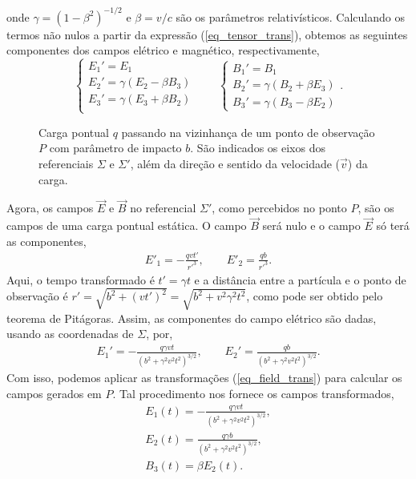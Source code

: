 onde $\gamma = (1-\beta ^2)^{-1/2}$ e $\beta = v/c$ são os parâmetros
relativísticos. Calculando os termos não nulos a partir da expressão
(\ref{eq_tensor_trans}), obtemos as seguintes componentes dos campos elétrico e
magnético, respectivamente,
\begin{equation}
	\label{eq_field_trans}
    \begin{cases}
	E_1' = E_1 \\
	E_2' = \gamma (E_2 - \beta B_3) \\
	E_3' = \gamma (E_3 + \beta B_2) \\
	\end{cases} \qquad
    \begin{cases}
	B_1 ' = B_1 \\
	B_2 ' = \gamma (B_2 + \beta E_3) \\
	B_3' = \gamma(B_3 - \beta E_2)
	\end{cases}.
\end{equation}

\begin{figure}[h]
	\centering
	\caption{Carga pontual $q$ passando na vizinhança de um ponto de observação
	$P$ com parâmetro de impacto $b$. São indicados os eixos dos referenciais
	$\Sigma$ e $\Sigma '$, além da direção e sentido da velocidade ($\vec{v}$)
	da carga. \label{fig_charge-passing}}
	\captionsetup{width=\textwidth}
	
\end{figure}

Agora, os campos $\vec{E}$ e $\vec{B}$ no referencial $\Sigma '$, como
percebidos no ponto $P$, são os campos de uma carga pontual estática. O campo
$\vec{B}$ será nulo e o campo $\vec{E}$ só terá as componentes,
\begin{gather}
	E' _1 = -\frac{qvt'}{{r'}^3}, \qquad
	E' _2 = \frac{qb}{{r'}^3}.
\end{gather}
Aqui, o tempo transformado é $t' = \gamma t$ e a distância entre a partícula e
o ponto de observação é $r' = \sqrt{b^2 + (vt')^2} = \sqrt{b^2 + v^2 \gamma ^2
t^2}$, como pode ser obtido pelo teorema de Pitágoras. Assim, as componentes do
campo elétrico são dadas, usando as coordenadas de $\Sigma$, por,
\begin{gather}
	E _1 '= - \frac{q\gamma vt}{(b^2 + \gamma ^2 v^2 t^2)^{3/2}},\qquad
	E _2 '= \frac{qb}{(b^2 + \gamma ^2 v^2 t^2)^{3/2}}.
\end{gather}
Com isso, podemos aplicar as transformações (\ref{eq_field_trans}) para
calcular os campos gerados em $P$. Tal procedimento nos fornece os campos
transformados,
\begin{gather}%
	E_1 (t) = -\frac{q\gamma vt}{(b^2 + \gamma ^2 v^2t^2)^{3/2}}
		\label{eq_field1},\\
	E_2 (t) = \frac{q\gamma b}{(b^2 + \gamma ^2 v^2 t
		^2)^{3/2}}\label{eq_field2},\\ 
	B_3 (t) = \beta E_2(t) \label{eq_field3}.
\end{gather}

